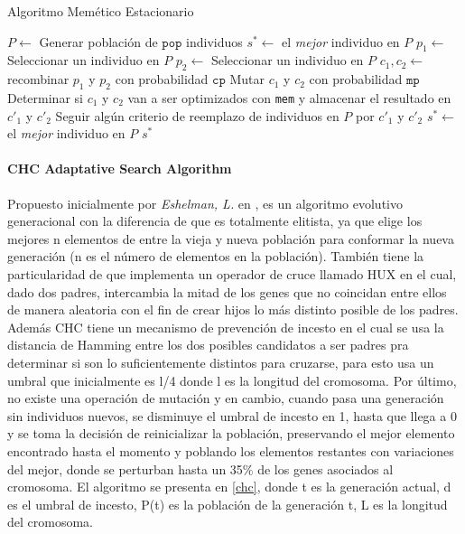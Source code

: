 \begin{algorithm}
\caption{Algoritmo Memético Estacionario}
\label{ssma}
\begin{algorithmic}[1]


\State $P \gets$ Generar población de $\texttt{pop}$ individuos
\State $s^* \gets $ el \emph{mejor} individuo en $P$
	\State $p_1 \gets$ Seleccionar un individuo en $P$
	\State $p_2 \gets$ Seleccionar un individuo en $P$
	\State $c_1, c_2 \gets $ recombinar $p_1$ y $p_2$ con probabilidad $\texttt{cp}$
	\State Mutar $c_1$ y $c_2$ con probabilidad $\texttt{mp}$
	\State Determinar si $c_1$ y $c_2$ van a ser optimizados con \texttt{mem} y almacenar el resultado en $c'_1$ y $c'_2$
	\State Seguir algún criterio de reemplazo de individuos en $P$ por $c'_1$ y $c'_2$
		\State $s^* \gets$ el \emph{mejor} individuo en $P$
	\EndIf
\EndWhile
\State \Return $s^*$

\end{algorithmic}
\end{algorithm}

\paragraph{CHC Adaptative Search Algorithm}

Propuesto inicialmente por \emph{Eshelman, L.} en \cite{eshelman1991chc}, es un algoritmo evolutivo generacional con la diferencia de que es totalmente elitista, ya que elige los mejores n elementos de entre la vieja y nueva población para conformar la nueva generación (n es el número de elementos en la población). También tiene la particularidad de que implementa un operador de cruce llamado HUX en el cual, dado dos padres, intercambia la mitad de los genes que no coincidan entre ellos de manera aleatoria con el fin de crear hijos lo más distinto posible de los padres. Además CHC tiene un mecanismo de prevención de incesto en el cual se usa la distancia de Hamming entre los dos posibles candidatos a ser padres pra determinar si son lo suficientemente distintos para cruzarse, para esto usa un umbral que inicialmente es l/4 donde l es la longitud del cromosoma. Por último, no existe una operación de mutación y en cambio, cuando pasa una generación sin individuos nuevos, se disminuye el umbral de incesto en 1, hasta que llega a 0 y se toma la decisión de reinicializar la población, preservando el mejor elemento encontrado hasta el momento y poblando los elementos restantes con variaciones del mejor, donde se perturban hasta un 35\% de los genes asociados al cromosoma. El algoritmo se presenta en \ref{chc}, donde t es la generación actual, d es el umbral de incesto, P(t) es la población de la generación t, L es la longitud del cromosoma.

